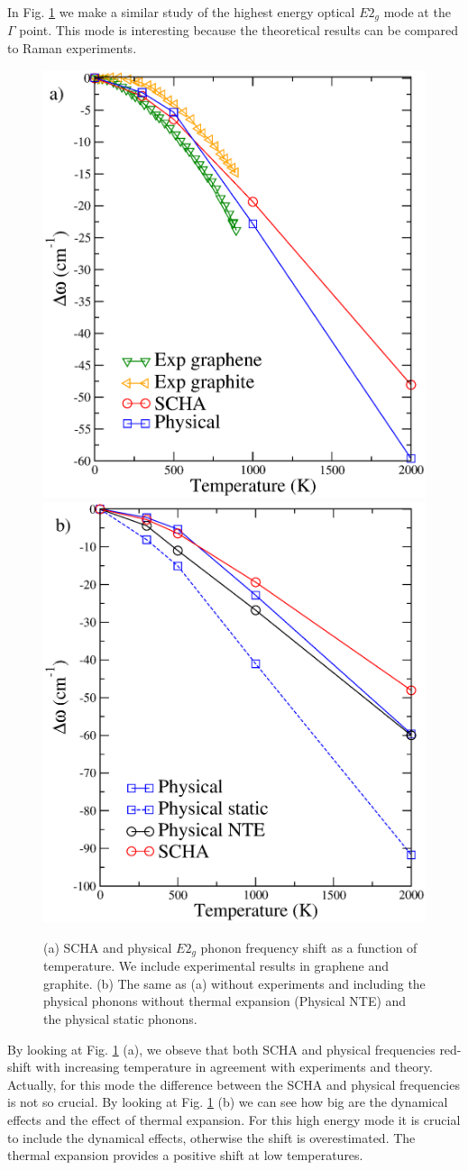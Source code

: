 In Fig. \ref{e2g} we make a similar study of the highest energy optical $E2_{g}$ mode at the $\Gamma$ point. This 
mode is interesting because the theoretical results can be compared to Raman experiments\cite{linas2015interplay}. 
\begin{figure}[ht]
\includegraphics[width=0.49\linewidth]{Figures/e2g1.eps}
\includegraphics[width=0.49\linewidth]{Figures/e2g2.eps}
	\caption[E2g mode temperature dependent frequency shift]{(a) SCHA and physical $E2_{g}$ phonon frequency 
	shift as a function of temperature. We include experimental results in graphene\cite{linas2015interplay} and 
	graphite\cite{kagi1994proper,tan1999intrinsic}. (b) The same as (a) without experiments and including the 
	physical phonons without thermal expansion (Physical NTE) and the physical static phonons.}
\label{e2g}
\end{figure}
By looking at Fig. \ref{e2g} (a), we obseve that both SCHA and physical frequencies red-shift with increasing 
temperature in agreement with experiments and theory\cite{calizo2007temperature,bonini2007phonon}. Actually, for 
this mode the difference between the SCHA and physical frequencies is not so crucial. By looking at Fig. \ref{e2g} 
(b) we can see how big are the dynamical effects and the effect of thermal expansion. For this high energy mode it 
is crucial to include the dynamical effects, otherwise the shift is overestimated. The thermal expansion provides 
a positive shift at low temperatures. 

